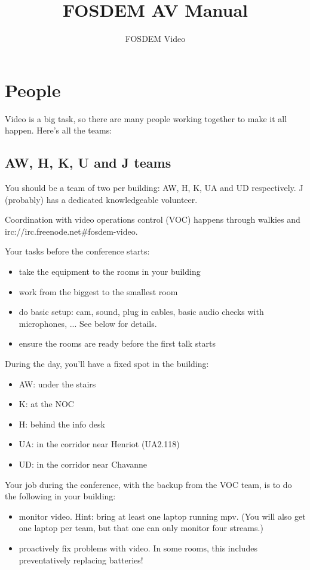 \documentclass{article}
\title{FOSDEM AV Manual}
\author{FOSDEM Video}
\begin{document}
\maketitle \thispagestyle{empty}
\newpage

\tableofcontents
\newpage

\section{People}
Video is a big task, so there are many people working together to make it all happen. Here's all the teams:

\subsection{AW, H, K, U and J teams}
You should be a team of two per building: AW, H, K, UA and UD respectively. J (probably) has a dedicated knowledgeable volunteer.

Coordination with video operations control (VOC) happens through walkies and irc://irc.freenode.net\#fosdem-video.

Your tasks before the conference starts:
\begin{itemize}
  \item take the equipment to the rooms in your building
  \item work from the biggest to the smallest room
  \item do basic setup: cam, sound, plug in cables, basic audio checks with microphones, ... See below for details.
  \item ensure the rooms are ready before the first talk starts
\end{itemize}

During the day, you'll have a fixed spot in the building:
\begin{itemize}
  \item AW: under the stairs
  \item K: at the NOC
  \item H: behind the info desk
  \item UA: in the corridor near Henriot (UA2.118)
  \item UD: in the corridor near Chavanne
\end{itemize}

Your job during the conference, with the backup from the VOC team, is to do the following in your building:
\begin{itemize}
	\item monitor video. Hint: bring at least one laptop running mpv. (You will also get one laptop per team, but that one can only monitor four streams.)
  \item proactively fix problems with video. In some rooms, this includes preventatively replacing batteries!
\end{itemize}
\end{document}
